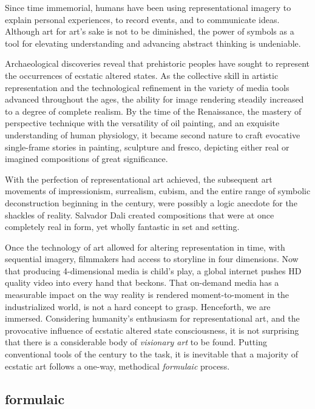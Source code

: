 \documentclass{UIdahoMastersThesis}
\begin{document}
Since time immemorial, humans have been using representational imagery to explain personal experiences, to record events, and to communicate ideas. Although art for art's sake is not to be diminished, the power of symbols as a tool for elevating understanding and advancing abstract thinking is undeniable.

Archaeological discoveries reveal that prehistoric peoples have sought to represent the occurrences of ecstatic altered states. As the collective skill in artistic representation and the technological refinement in the variety of media tools advanced throughout the ages, the ability for image rendering steadily increased to a degree of complete realism. By the time of the Renaissance, the mastery of perspective technique with the versatility of oil painting, and an exquisite understanding of human physiology, it became second nature to craft evocative single-frame stories in painting, sculpture and fresco, depicting either real or imagined compositions of great significance.  

With the perfection of representational art achieved, the subsequent art movements of impressionism, surrealism, cubism, and the entire range of symbolic deconstruction beginning in the  century, were possibly a logic anecdote for the shackles of reality. Salvador Dali created compositions that were at once completely real in form, yet wholly fantastic in set and setting.

Once the technology of art allowed for altering representation in time, with sequential imagery, filmmakers had access to storyline in four dimensions. Now that producing 4-dimensional media is child's play, a global internet pushes HD quality video into every hand that beckons. That on-demand media has a measurable impact on the way reality is rendered moment-to-moment in the industrialized world, is not a hard concept to grasp. Henceforth, we are immersed.
Considering humanity's enthusiasm for representational art, and the provocative influence of ecstatic altered state consciousness, it is not surprising that there is a considerable body of \emph{visionary art} to be found. Putting conventional tools of the  century to the task, it is inevitable that a majority of ecstatic art follows a one-way, methodical \emph{formulaic} process. 


\subsection{formulaic}
\end{document}

